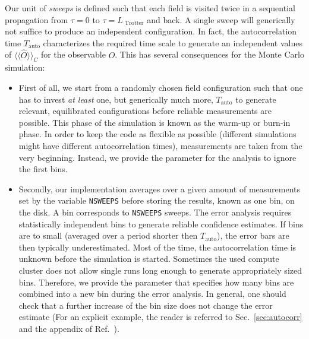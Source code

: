  Our unit of \textit{sweeps} is defined such that each field is visited twice in a sequential propagation from $\tau = 0$ to $\tau = L_{\text{ Trotter}}$  and back.  A single sweep will  generically not  suffice to produce an independent  configuration.
In fact, the autocorrelation time $T_\mathrm{auto}$ characterizes the required time scale to generate an independent  values of $\langle\langle\hat{O}\rangle\rangle_C$ for the observable $O$. This has several consequences for the Monte Carlo simulation:
\begin{itemize}
	\item First of all, we start from a randomly chosen field configuration such that one has to invest \textit{at least}  one, but generically much more, $T_\mathrm{auto}$ to generate relevant, equilibrated configurations before reliable measurements are possible. This phase of the simulation is known as the warm-up or burn-in phase. In order to keep the code as flexible as possible (different simulations might have different autocorrelation times), measurements are taken from the very beginning. Instead, we provide the parameter  for the analysis to ignore the first  bins.
	\item Secondly, our implementation averages over a given amount of measurements   set by the variable \texttt{NSWEEPS}  before storing the results, known as one bin, on the disk.  A bin corresponds to \texttt{NSWEEPS}  sweeps. The  error analysis requires statistically  independent bins to generate reliable confidence estimates. If bins are to small (averaged over a period shorter then $T_\mathrm{auto}$), the error bars are then typically underestimated. Most of the time, the autocorrelation time is unknown before the simulation is started.  Sometimes the used compute cluster does not allow single runs long enough to generate appropriately sized bins. Therefore, we provide the  parameter that specifies how many bins are combined into a new bin during the error analysis. In general, one should check that a further increase of the bin size does not change the error estimate   (For an explicit example, the reader is referred to Sec.~\ref{sec:autocorr} and the appendix of Ref.~\cite{Assaad02}).


\end{itemize}
